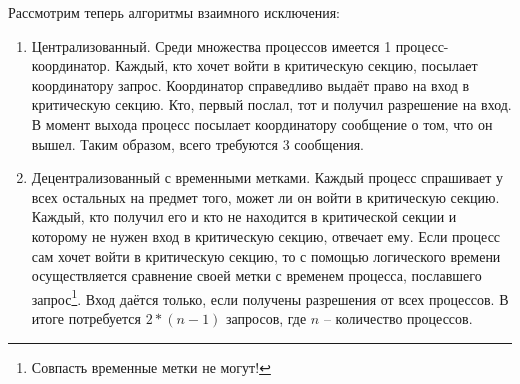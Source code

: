 \documentclass[a4paper,12pt]{article}
\begin{document}
	Рассмотрим теперь алгоритмы взаимного исключения:
	\begin{enumerate}
		\item Централизованный. Среди множества процессов имеется 1 процесс-координатор. Каждый,
		кто хочет войти в критическую секцию, посылает координатору запрос. Координатор
		справедливо выдаёт право на вход в критическую секцию. Кто, первый послал, тот и получил
		разрешение на вход. В момент выхода процесс посылает координатору сообщение о том, что
		он вышел. Таким образом, всего требуются 3 сообщения.
		\item Децентрализованный с временными метками. Каждый процесс спрашивает у всех
		остальных на предмет того, может ли он войти в критическую секцию. Каждый, кто получил
		его и кто не находится в критической секции и которому не нужен вход в критическую
		секцию, отвечает ему. Если процесс сам хочет войти в критическую секцию, то с помощью
		логического времени осуществляется сравнение своей метки с временем процесса, пославшего
		запрос\footnote{Совпасть временные метки не могут!}. Вход даётся только, если получены
		разрешения от всех процессов. В итоге потребуется $2*(n-1)$ запросов, где $n$ --
		количество процессов.
	

\end{enumerate}
\end{document}
